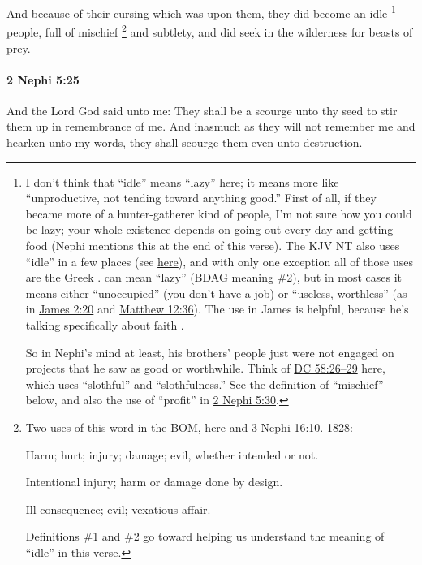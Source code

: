 			And because of their cursing which was upon them,
			they did become an \hyperref[IDLENESS]{idle}%
				\footnote{%
					\label{2NEPHI-5-24-idle}%
					I don't think that ``idle'' means ``lazy'' here; it means more like ``unproductive, not tending toward anything good.'' First of all, if they became more of a hunter-gatherer kind of people, I'm not sure how you could be lazy; your whole existence depends on going out every day and getting food (Nephi mentions this at the end of this verse). The KJV NT also uses ``idle'' in a few places (see \hyperref[IDLENESS-NT-KJV]{here}), and with only one exception all of those uses are the Greek \hyperref[ARGOS]{}.  can mean ``lazy'' (BDAG meaning \#2), but in most cases it means either ``unoccupied'' (you don't have a job) or ``useless, worthless'' (as in \hyperref[JAMES-2-20]{James 2:20} and \hyperref[MATTHEW-12-36]{Matthew 12:36}). The use in James is helpful, because he's talking specifically about faith .
					
					So in Nephi's mind at least, his brothers' people just were not engaged on projects that he saw as good or worthwhile. Think of \hyperref[DC58-26]{DC 58:26--29} here, which uses ``slothful'' and ``slothfulness.'' See the definition of ``mischief'' below, and also the use of ``profit'' in \hyperref[2NEPHI-5-30]{2 Nephi 5:30}.
					}
			people, full of mischief%
				\footnote{%
					\label{2NEPHI-5-24-mischief}%
					Two uses of this word in the BOM, here and \hyperref[3NEPHI-16-10]{3 Nephi 16:10}. 1828:
						\begin{compactitem}
							\item[1] Harm; hurt; injury; damage; evil, whether intended or not.
							\item[2] Intentional injury; harm or damage done by design.
							\item[3] Ill consequence; evil; vexatious affair.
						\end{compactitem}
					Definitions \#1 and \#2 go toward helping us understand the meaning of ``idle'' in this verse.
					}
			and subtlety,
			and did seek in the wilderness for beasts of prey.

		\paragraph{2 Nephi 5:25} %
			\label{2NEPHI-5-25}

			And the Lord God said unto me:
			They shall be a scourge unto thy seed to stir them up in remembrance of me.
			And inasmuch as they will not remember me and hearken unto my words,
			they shall scourge them even unto destruction.

